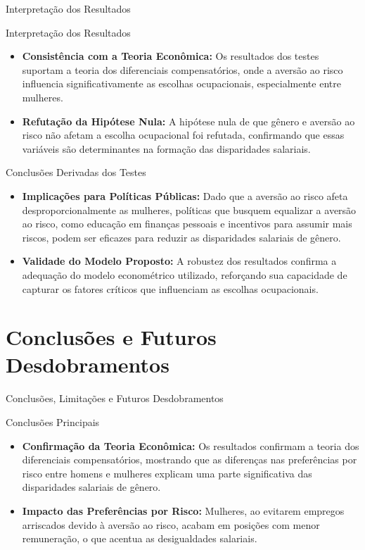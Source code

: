 \documentclass[aspectratio=169, xcolor={dvipsnames}, 10pt, brazil]{beamer}
\begin{document}
\begin{frame}{Interpretação dos Resultados}
    \begin{block}{Interpretação dos Resultados}
        \begin{itemize}
            \item \textbf{Consistência com a Teoria Econômica:} Os resultados dos testes suportam a teoria dos diferenciais compensatórios, onde a aversão ao risco influencia significativamente as escolhas ocupacionais, especialmente entre mulheres.
            \item \textbf{Refutação da Hipótese Nula:} A hipótese nula de que gênero e aversão ao risco não afetam a escolha ocupacional foi refutada, confirmando que essas variáveis são determinantes na formação das disparidades salariais.
        \end{itemize}
    \end{block}
    
    \vspace{0.5cm}
    
    \begin{block}{Conclusões Derivadas dos Testes}
        \begin{itemize}
            \item \textbf{Implicações para Políticas Públicas:} Dado que a aversão ao risco afeta desproporcionalmente as mulheres, políticas que busquem equalizar a aversão ao risco, como educação em finanças pessoais e incentivos para assumir mais riscos, podem ser eficazes para reduzir as disparidades salariais de gênero.
            \item \textbf{Validade do Modelo Proposto:} A robustez dos resultados confirma a adequação do modelo econométrico utilizado, reforçando sua capacidade de capturar os fatores críticos que influenciam as escolhas ocupacionais.
        \end{itemize}
    \end{block}
\end{frame}

\section{Conclusões e Futuros Desdobramentos}
\begin{frame}{Conclusões, Limitações e Futuros Desdobramentos}
    \begin{block}{Conclusões Principais}
        \begin{itemize}
            \item \textbf{Confirmação da Teoria Econômica:} Os resultados confirmam a teoria dos diferenciais compensatórios, mostrando que as diferenças nas preferências por risco entre homens e mulheres explicam uma parte significativa das disparidades salariais de gênero.
            \item \textbf{Impacto das Preferências por Risco:} Mulheres, ao evitarem empregos arriscados devido à aversão ao risco, acabam em posições com menor remuneração, o que acentua as desigualdades salariais.
        \end{itemize}
    \end{block}
\end{frame}
\end{document}
